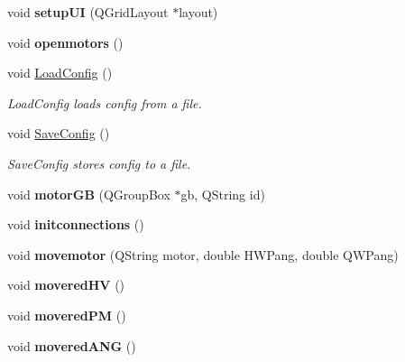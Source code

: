 \begin{DoxyCompactItemize}
\item 
\mbox{\label{classcagecontrol_a79a089c4e7196a7c158aa62f4883ba18}} 
void {\bfseries setup\+UI} (Q\+Grid\+Layout $\ast$layout)
\item 
\mbox{\label{classcagecontrol_ae961f42ea421a8d512964f158b0201e8}} 
void {\bfseries openmotors} ()
\item 
void \hyperlink{classcagecontrol_a0e6648cef5e6d08d638aa2472824cb6b}{Load\+Config} ()
\begin{DoxyCompactList}\small\item\em Load\+Config loads config from a file. \end{DoxyCompactList}\item 
void \hyperlink{classcagecontrol_a217d948983c0d1c153d29c728b06d764}{Save\+Config} ()
\begin{DoxyCompactList}\small\item\em Save\+Config stores config to a file. \end{DoxyCompactList}\item 
\mbox{\label{classcagecontrol_a2fd60ea2aa138472e3714dbd25cadc55}} 
void {\bfseries motor\+GB} (Q\+Group\+Box $\ast$gb, Q\+String id)
\item 
\mbox{\label{classcagecontrol_a56c01018dbd0d16a360106c438539c9e}} 
void {\bfseries initconnections} ()
\item 
\mbox{\label{classcagecontrol_a4e2c79dc05f66b2b15ae01eaa8d39fca}} 
void {\bfseries movemotor} (Q\+String motor, double H\+W\+Pang, double Q\+W\+Pang)
\item 
\mbox{\label{classcagecontrol_acb242e48298555a31dcff17bff83b885}} 
void {\bfseries movered\+HV} ()
\item 
\mbox{\label{classcagecontrol_ac0a1c61636bd51739426e43efd488620}} 
void {\bfseries movered\+PM} ()
\item 
\mbox{\label{classcagecontrol_a2fc1b98fb22ede9c62c72dec1a228727}} 
void {\bfseries movered\+A\+NG} ()
\item 

\end{DoxyCompactItemize}

